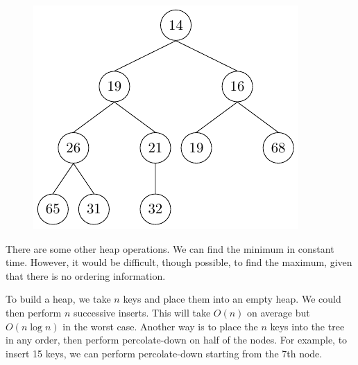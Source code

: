 \begin{center}
\begin{minipage}{0.32\textwidth}
\begin{figure}[H]
\end{figure}
\end{minipage}
\begin{minipage}{0.32\textwidth}
\begin{figure}[H]
  \centering
  \includegraphics[width=\textwidth]{Figure/HeapD6.pdf}
\end{figure}
\end{minipage}
\end{center}

There are some other heap operations. We can find the minimum in constant time. However, it would be difficult, though possible, to find the maximum, given that there is no ordering information.

To build a heap, we take \(n\) keys and place them into an empty heap. We could then perform \(n\) successive inserts. This will take \(O(n)\) on average but \(O(n \log n)\) in the worst case. Another way is to place the \(n\) keys into the tree in any order, then perform percolate-down on half of the nodes. For example, to insert 15 keys, we can perform percolate-down starting from the 7th node.

